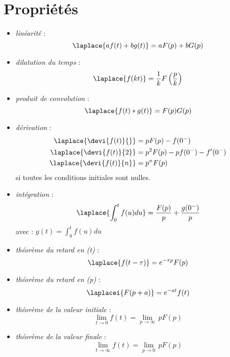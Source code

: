 \section{Propriétés} 
\begin{itemize}
    \item \emph{linéarité} :
    \[ 
        \laplace{af(t)+bg(t)} = aF(p) + bG(p)
    \]
    \item \emph{dilatation du temps} : 
    \[ 
        \laplace{f(kt)}=\dfrac{1}{k}F\left(\dfrac{p}{k}\right)
    \]
    \item \emph{produit de convolution} : 
    \[
        \laplace{f(t)*g(t)} = F(p)G(p)
    \]
    \item \emph{dérivation} : 
    \begin{align*}
        \laplace{\devi{f(t)}{}}&=pF(p) - f(0^-) \\
        \laplace{\devi{f(t)}{2}}&=p^2F(p) - pf(0^-) - f'(0^-)\\
        \laplace{\devi{f(t)}{n}}&=p^nF(p) 
    \end{align*}
    si toutes les conditions initiales sont nulles.
    \item \emph{intégration} :
    \[
        \laplace{\int_0^t f(u)du} = \dfrac{F(p)}{p} + \dfrac{g(0^-)}{p}
    \]
        avec :  $g(t)=\int_0^t f(u)du$
    \item \emph{théorème du retard en (t)} :
    \[
        \laplace{f(t-\tau)}=e^{-\tau p}F(p)
    \]
    \item \emph{théorème du retard en (p)} :
    \[
        \laplacei{F(p+a)}=e^{-at}f(t)
    \]
    \item \emph{théorème de la valeur initiale} :
    \[
        \lim\limits_{t \to 0} f(t)=\lim\limits_{p \to \infty}\, p F(p)
    \]
    \item \emph{théorème de la valeur finale} :
    \[
        \lim\limits_{t \to \infty} f(t)=\lim\limits_{p \to 0}\,p F(p)
    \]
\end{itemize}
\clearpage
